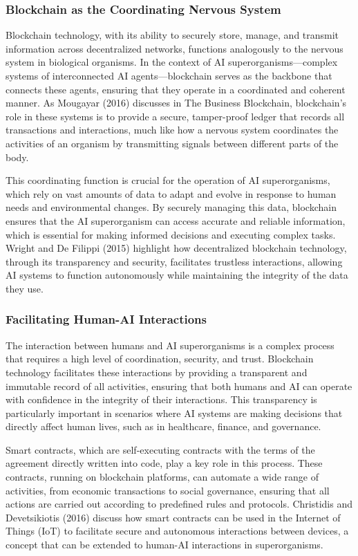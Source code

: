 \documentclass[12pt,twoside]{article}
\begin{document}
\subsubsection{Blockchain as the Coordinating Nervous System}

Blockchain technology, with its ability to securely store, manage, and transmit information across decentralized networks, functions analogously to the nervous system in biological organisms. In the context of AI superorganisms—complex systems of interconnected AI agents—blockchain serves as the backbone that connects these agents, ensuring that they operate in a coordinated and coherent manner. As Mougayar (2016) discusses in The Business Blockchain, blockchain’s role in these systems is to provide a secure, tamper-proof ledger that records all transactions and interactions, much like how a nervous system coordinates the activities of an organism by transmitting signals between different parts of the body.

This coordinating function is crucial for the operation of AI superorganisms, which rely on vast amounts of data to adapt and evolve in response to human needs and environmental changes. By securely managing this data, blockchain ensures that the AI superorganism can access accurate and reliable information, which is essential for making informed decisions and executing complex tasks. Wright and De Filippi (2015) highlight how decentralized blockchain technology, through its transparency and security, facilitates trustless interactions, allowing AI systems to function autonomously while maintaining the integrity of the data they use.

\subsubsection{Facilitating Human-AI Interactions}

The interaction between humans and AI superorganisms is a complex process that requires a high level of coordination, security, and trust. Blockchain technology facilitates these interactions by providing a transparent and immutable record of all activities, ensuring that both humans and AI can operate with confidence in the integrity of their interactions. This transparency is particularly important in scenarios where AI systems are making decisions that directly affect human lives, such as in healthcare, finance, and governance.

Smart contracts, which are self-executing contracts with the terms of the agreement directly written into code, play a key role in this process. These contracts, running on blockchain platforms, can automate a wide range of activities, from economic transactions to social governance, ensuring that all actions are carried out according to predefined rules and protocols. Christidis and Devetsikiotis (2016) discuss how smart contracts can be used in the Internet of Things (IoT) to facilitate secure and autonomous interactions between devices, a concept that can be extended to human-AI interactions in superorganisms.
\end{document}
